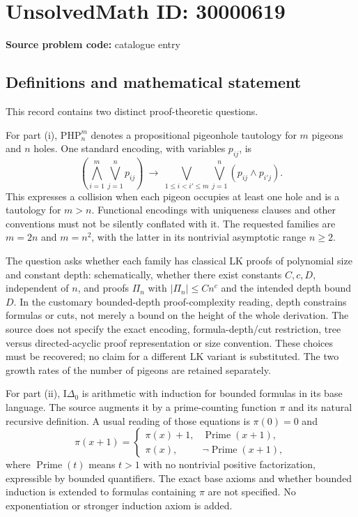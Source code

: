 \documentclass[11pt]{article}
\begin{document}
\section*{UnsolvedMath ID: 30000619}
\textbf{Source problem code:} catalogue entry
\subsection{Definitions and mathematical statement}
This record contains two distinct proof-theoretic questions.

For part (i), \(\mathrm{PHP}_n^m\) denotes a propositional pigeonhole tautology for \(m\) pigeons and \(n\) holes. One standard encoding, with variables \(p_{ij}\), is
\[
 \left(\bigwedge_{i=1}^m\bigvee_{j=1}^n p_{ij}\right)
 \ \longrightarrow\
 \bigvee_{1\leq i<i'\leq m}\bigvee_{j=1}^n(p_{ij}\wedge p_{i'j}).
\]
This expresses a collision when each pigeon occupies at least one hole and is a tautology for \(m>n\). Functional encodings with uniqueness clauses and other conventions must not be silently conflated with it. The requested families are \(m=2n\) and \(m=n^2\), with the latter in its nontrivial asymptotic range \(n\geq2\).

The question asks whether each family has classical LK proofs of polynomial size and constant depth: schematically, whether there exist constants \(C,c,D\), independent of \(n\), and proofs \(\Pi_n\) with \(|\Pi_n|\leq Cn^c\) and the intended depth bound \(D\). In the customary bounded-depth proof-complexity reading, depth constrains formulas or cuts, not merely a bound on the height of the whole derivation. The source does not specify the exact encoding, formula-depth/cut restriction, tree versus directed-acyclic proof representation or size convention. These choices must be recovered; no claim for a different LK variant is substituted. The two growth rates of the number of pigeons are retained separately.

For part (ii), \(\mathrm I\Delta_0\) is arithmetic with induction for bounded formulas in its base language. The source augments it by a prime-counting function \(\pi\) and its natural recursive definition. A usual reading of those equations is \(\pi(0)=0\) and
\[
 \pi(x+1)=\begin{cases}\pi(x)+1,&\operatorname{Prime}(x+1),\\
 \pi(x),&\neg\operatorname{Prime}(x+1),\end{cases}
\]
where \(\operatorname{Prime}(t)\) means \(t>1\) with no nontrivial positive factorization, expressible by bounded quantifiers. The exact base axioms and whether bounded induction is extended to formulas containing \(\pi\) are not specified. No exponentiation or stronger induction axiom is added.
\end{document}
